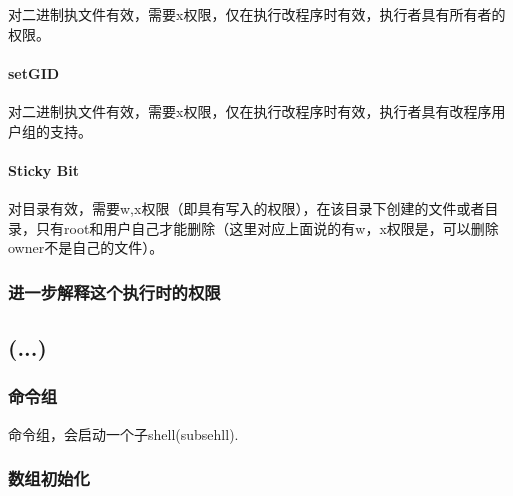 对二进制执文件有效，需要x权限，仅在执行改程序时有效，执行者具有所有者的权限。

\paragraph{setGID}

对二进制执文件有效，需要x权限，仅在执行改程序时有效，执行者具有改程序用户组的支持。

\paragraph{Sticky Bit}

对目录有效，需要w,x权限（即具有写入的权限），在该目录下创建的文件或者目录，只有root和用户自己才能删除（这里对应上面说的有w，x权限是，可以删除owner不是自己的文件）。


\subsubsection{进一步解释这个执行时的权限}



\subsection{(...)}

\subsubsection{命令组}

命令组，会启动一个子shell(subsehll).

\subsubsection{数组初始化}





